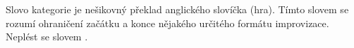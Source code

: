 \needspace{5cm} \label{kategorie} Slovo kategorie je nešikovný překlad anglického slovíčka   (hra). Tímto slovem se rozumí ohraničení začátku a konce nějakého určitého formátu improvizace. Neplést se slovem .  
 
 
